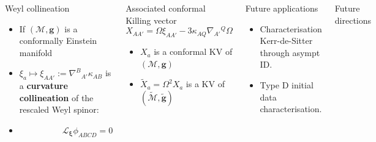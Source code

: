 \documentclass[10pt]{beamer}
\theoremstyle{plain}
\def\bmg{{\bm g}}
\begin{document}
\begin{frame}
  \begin{columns}
    \column{6.0cm}
    \vspace{-4mm}
    \begin{exampleblock}{Weyl collineation}
      \begin{itemize}
       \item  If $(\mathcal{M},\bmg)$ is a conformally Einstein manifold
       \item $\xi_{a} \mapsto \xi_{AA'}:= \nabla^{B}{}_{A'}\kappa_{AB}$ is a
         \textbf{curvature collineation} of the rescaled Weyl spinor:
      \item $\qquad \qquad \quad \mathcal{L}_{\bm\xi}\phi_{ABCD}=0$
      \end{itemize}
    \end{exampleblock}
    \vspace{-3mm}
    \begin{block}{Associated conformal Killing vector}
      \vspace{-3mm}
      \begin{equation*}\label{eq:conformalKillingVector}
  X_{AA'}=\Omega \xi_{AA'} - 3 \kappa_{AQ}\nabla_{A'}{}^{Q}\Omega
      \end{equation*}
      \vspace{-5mm}
      \begin{itemize}
\item $X_a$ is a conformal KV of $(\mathcal{M},\bmg)$
\item $\tilde{X}_a=\Omega^{2}X_{a}$ is a KV of $(\tilde{\mathcal{M}},\tilde{\bmg})$
      \end{itemize}
      \pause
    \end{block}
    \begin{exampleblock}{Future applications}
      \begin{itemize}
    \item  Characterisation Kerr-de-Sitter through asympt ID.
    \item  Type D initial data characterisation.
      \end{itemize}
     \end{exampleblock}
    \column{4cm}
     \begin{block}{Future directions}
       \begin{itemize}
         

\end{itemize}
\end{block}
\end{columns}
\end{frame}
\end{document}
